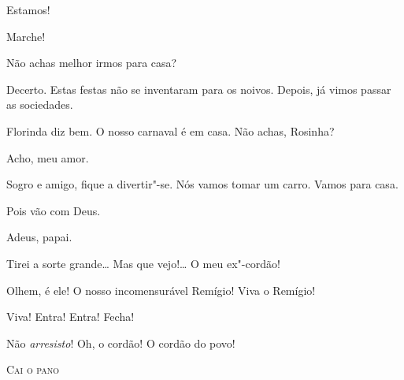  Estamos!

 Marche!  










  Não achas melhor irmos para casa?

 Decerto. Estas festas não se inventaram para os noivos.
Depois, já vimos passar as sociedades.

 Florinda diz bem. O nosso carnaval é em casa. Não achas,
Rosinha?

 Acho, meu amor.

 Sogro e amigo, fique a divertir"-se. Nós vamos tomar um carro.
Vamos para casa.

 Pois vão com Deus.  

 Adeus, papai.




 Tirei a sorte grande\ldots{} Mas que vejo!\ldots{} O meu ex"-cordão!

 Olhem, é ele! O nosso incomensurável Remígio! Viva o
Remígio! 

 Viva! Entra! Entra! Fecha!  

 Não \textit{arresisto}! Oh, o cordão! O cordão do povo!



\bigskip

\begin{center}
\textsc{Cai o pano}
\end{center}


